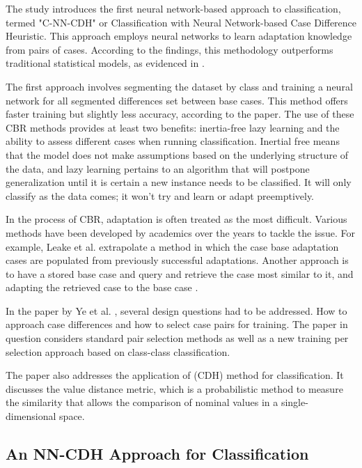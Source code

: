 \documentclass[a4paper, 12pt]{report}
\begin{document}
The study introduces the first neural network-based approach to classification, termed "C-NN-CDH" or Classification with Neural Network-based Case Difference Heuristic. 
This approach employs neural networks to learn adaptation knowledge from pairs of cases. According to the findings, this methodology outperforms traditional statistical models, as evidenced in \cite{jalali2017learning}.

The first approach involves segmenting the dataset by class and training a neural network for all segmented differences set between base cases. 
This method offers faster training but slightly less accuracy, according to the paper. 
The use of these CBR methods provides at least two benefits: inertia-free lazy learning and the ability to assess different cases when running classification. 
Inertial free means that the model does not make assumptions based on the underlying structure of the data, and lazy learning pertains to an algorithm that will postpone generalization 
until it is certain a new instance needs to be classified. It will only classify as the data comes; it won't try and learn or adapt preemptively.

In the process of CBR, adaptation is often treated as the most difficult. Various methods have been developed by academics over the years to tackle the issue. 
For example, Leake et al. \cite{leake1996acquiring} extrapolate a method in which the case base adaptation cases are populated from previously successful adaptations. 
Another approach is to have a stored base case and query and retrieve the case most similar to it, and adapting the retrieved case to the base case \cite{craw2006learning}.

In the paper by Ye et al. \cite{ye2021learning}, several design questions had to be addressed. 
How to approach case differences and how to select case pairs for training. 
The paper in question \cite{ye2021learning} considers standard pair selection methods as well as a new training per selection approach based on class-class classification.

The paper \cite{ye2021learning} also addresses the application of (CDH) method for classification. 
It discusses the value distance metric, which is a probabilistic method to measure the similarity that allows the comparison of nominal values in a single-dimensional space.

\subsection{An NN-CDH Approach for Classification}
\end{document}
